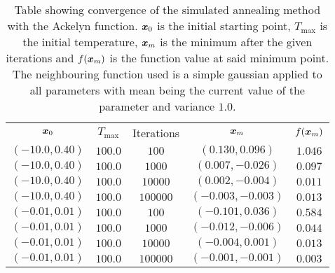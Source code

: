         \begin{table}[H]
            \centering
            \caption{Table showing convergence of the simulated annealing
            method with the Ackelyn function. $\boldsymbol{{x}}_0$ is the initial
            starting point, $T_{\text{max}}$ is the initial temperature,
            $\boldsymbol{{x}}_m$ is the minimum after the given iterations and
            $f(\boldsymbol{{x}}_m)$ is the function value at said minimum point. The
            neighbouring function used is a simple gaussian applied to all
            parameters with mean being the current value of the parameter and
            variance $1.0$.}
            \label{tab:ackelynconv}
            \begin{tabular}{ccccc} \hline\hline
                $\boldsymbol{{x}}_0$ & $T_{\text{max}}$ & Iterations & $\boldsymbol{{x}}_m$ & $f(\boldsymbol{{x}}_m)$ \\
                $(-10.0,0.40)$ & $100.0$ & $100$ & $(0.130,0.096)$ & $1.046$ \\
                $(-10.0,0.40)$ & $100.0$ & $1000$ & $(0.007,-0.026)$ & $0.097$ \\
                $(-10.0,0.40)$ & $100.0$ & $10000$ & $(0.002,-0.004)$ & $0.011$ \\
                $(-10.0,0.40)$ & $100.0$ & $100000$ & $(-0.003,-0.003)$ & $0.013$ \\
                $(-0.01,0.01)$ & $100.0$ & $100$ & $(-0.101,0.036)$ & $0.584$ \\
                $(-0.01,0.01)$ & $100.0$ & $1000$ & $(-0.012,-0.006)$ & $0.044$ \\
                $(-0.01,0.01)$ & $100.0$ & $10000$ & $(-0.004,0.001)$ & $0.013$ \\
                $(-0.01,0.01)$ & $100.0$ & $100000$ & $(-0.001,-0.001)$ & $0.003$ \\ \hline\hline
            \end{tabular}
        \end{table}
